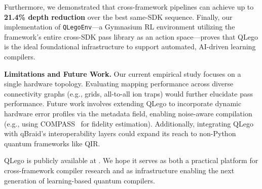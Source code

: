 \documentclass[conference]{IEEEtran}
\begin{document}
Furthermore, we demonstrated that cross-framework pipelines can achieve up to \textbf{21.4\% depth reduction} over the best same-SDK sequence. Finally, our implementation of \texttt{QLegoEnv}---a Gymnasium RL environment utilizing the framework's entire cross-SDK pass library as an action space---proves that QLego is the ideal foundational infrastructure to support automated, AI-driven learning compilers.

\textbf{Limitations and Future Work.} Our current empirical study focuses on a single hardware topology. Evaluating mapping performance across diverse connectivity graphs (e.g., grids, all-to-all ion traps) would further elucidate pass performance. Future work involves extending QLego to incorporate dynamic hardware error profiles via the metadata field, enabling noise-aware compilation (e.g., using COMPASS~\cite{dangwal2024compass} for fidelity estimation). Additionally, integrating QLego with qBraid's interoperability layers could expand its reach to non-Python quantum frameworks like QIR.

QLego is publicly available at \cite{repository}. We hope it serves as both a practical platform for cross-framework compiler research and as infrastructure enabling the next generation of learning-based quantum compilers.



\printbibliography
\end{document}
